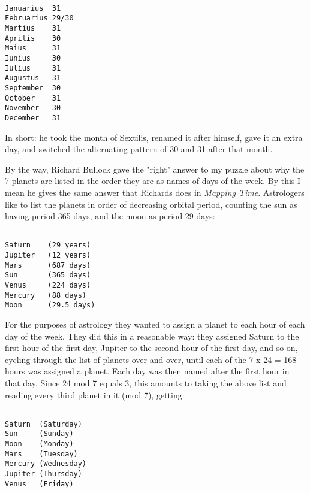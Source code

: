 \begin{verbatim}

Januarius  31
Februarius 29/30
Martius    31
Aprilis    30
Maius      31
Iunius     30
Iulius     31
Augustus   31
September  30
October    31
November   30
December   31
\end{verbatim}
    
In short: he took the month of Sextilis, renamed it after himself, 
gave it an extra day, and switched the alternating pattern of 30 and
31 after that month.  

By the way, Richard Bullock gave the "right" answer to my puzzle 
about why the 7 planets are listed in the order they are as names 
of days of the week.  By this I mean he gives the same answer that 
Richards does in \emph{Mapping Time}.  Astrologers like to list the 
planets in order of decreasing orbital period, counting the sun 
as having period 365 days, and the moon as period 29 days:


\begin{verbatim}

Saturn    (29 years)
Jupiter   (12 years)
Mars      (687 days)
Sun       (365 days)
Venus     (224 days)
Mercury   (88 days)
Moon      (29.5 days)
\end{verbatim}
    

For the purposes of astrology they wanted to assign a planet to
each hour of each day of the week.  They did this in a reasonable
way: they assigned Saturn to the first hour of the first day,
Jupiter to the second hour of the first day, and so on, cycling
through the list of planets over and over, until each of the 
7 x 24 = 168 hours was assigned a planet.   Each day was then
named after the first hour in that day.   Since 24 mod 7 equals
3, this amounts to taking the above list and reading every third
planet in it (mod 7), getting:

\begin{verbatim}
 
Saturn  (Saturday)
Sun     (Sunday)
Moon    (Monday)
Mars    (Tuesday)
Mercury (Wednesday)
Jupiter (Thursday)
Venus   (Friday)
\end{verbatim}
    
